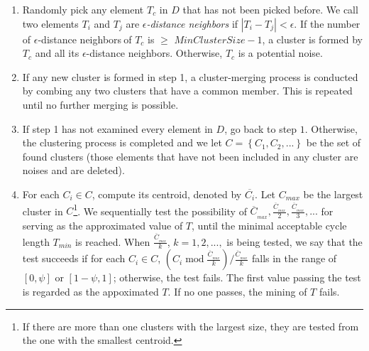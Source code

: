 \documentclass[final,oneside,onecolumn,12pt,a4paper]{book}%
\begin{document}
\begin{enumerate}
\item Randomly pick any element $T_{c}$ in $D$ that has not been picked
before. We call two elements $T_{i}$ and $T_{j}$ are $\epsilon$\emph{-distance
neighbors }if $\left\vert T_{i}-T_{j}\right\vert <\epsilon$. If the number of
$\epsilon$-distance neighbors$\ $of $T_{c}$ is $\geq$ $MinClusterSize-1$, a
cluster is formed by $T_{c}$ and all its $\epsilon$-distance neighbors.
Otherwise, $T_{c}$ is a potential noise.

\item If any new cluster is formed in step 1, a cluster-merging process is
conducted by combing any two clusters that have a common member. This is
repeated until no further merging is possible.

\item If step 1 has not examined every element in $D$, go back to step $1$.
Otherwise, the clustering process is completed and we let $C=\left\{
C_{1},C_{2},...\right\}  $ be the set of found clusters (those elements that
have not been included in any cluster are noises and are deleted).

\item For each $C_{i}\in C$, compute its centroid, denoted by $\overline
{C_{i}}$. Let $C_{max}$ be the largest cluster in $C$\footnote{If there are
more than one clusters with the largest size, they are tested from the one
with the smallest centroid.}. We sequentially test the possibility of
$\overline{C}_{_{max}},\frac{\overline{C}_{_{max}}}{2},\frac{\overline
{C}_{_{max}}}{3},...$ for serving as the approximated value of $T$, until the
minimal acceptable cycle length $T_{min}$ is reached. When $\frac{\overline
{C}_{_{max}}}{k}$, $k=1,2,...,$ is being tested, we say that the test succeeds
if for each $C_{i}\in C$, $\left(  C_{i}\operatorname{mod}\frac{\overline
{C}_{_{max}}}{k}\right)  /\frac{\overline{C}_{_{max}}}{k}$ falls in the range
of $[0,\psi]$ or $[1-\psi,1]$; otherwise, the test fails. The first value
passing the test is regarded as the appoximated $T$. If no one passes, the
mining of $T$ fails.
\end{enumerate}
\end{document}
